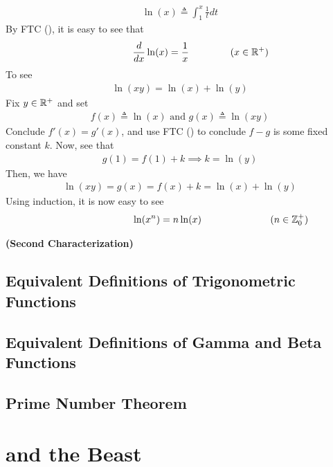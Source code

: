\documentclass{report}
\begin{document}
\begin{mdframed}
\begin{align*}
\ln (x)\triangleq \int_1^x \frac{1}{t}dt
\end{align*}
By FTC (), it is easy to see that 
 \begin{align*}
\hspace{1.5cm}\frac{d}{dx}\ln (x)=\frac{1}{x}\hspace{1.5cm}(x\in\mathbb{R}^+)
\end{align*}
To see 
\begin{align*}
\ln (xy)=\ln (x)+ \ln (y)
\end{align*}
Fix $y\in\mathbb{R}^+$ and set 
\begin{align*}
f(x)\triangleq \ln (x)\text{ and }g(x)\triangleq \ln(xy)
\end{align*}
Conclude $f'(x)=g'(x)$, and use FTC () to conclude $f-g$ is some fixed constant $k$. Now, see that 
\begin{align*}
g(1)=f(1)+k \implies k=\ln(y)
\end{align*}
Then, we have 
\begin{align*}
\ln(xy)=g(x)=f(x)+k=\ln (x)+ \ln (y)
\end{align*}
Using induction, it is now easy to see 
\begin{align*}
  \hspace{3cm}\ln (x^n)=n \ln (x)\hspace{2.5cm}(n\inz_0^+)
\end{align*}
\end{mdframed}
\begin{theorem}
\textbf{(Second Characterization)}
\end{theorem}
\section{Equivalent Definitions of Trigonometric Functions}
\section{Equivalent Definitions of Gamma and Beta Functions}
\section{Prime Number Theorem}


\chapter{and the Beast}
\end{document}
